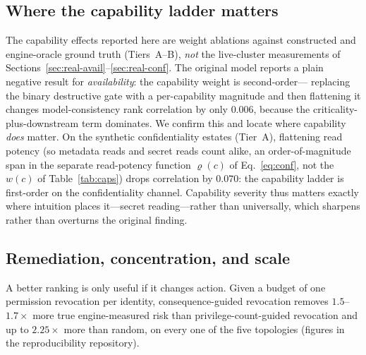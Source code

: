 \documentclass[conference]{IEEEtran}
\begin{document}
\subsection{Where the capability ladder matters}
The capability effects reported here are weight ablations against constructed and
engine-oracle ground truth (Tiers~A--B), \emph{not} the live-cluster measurements of
Sections~\ref{sec:real-avail}--\ref{sec:real-conf}. The original model reports a plain
negative result for \emph{availability}: the capability weight is second-order---
replacing the binary destructive gate with a per-capability magnitude and then
flattening it changes model-consistency rank correlation by only $0.006$, because the
criticality-plus-downstream term dominates. We confirm this and locate where capability
\emph{does} matter. On the synthetic confidentiality estates (Tier~A), flattening read
potency (so metadata reads and secret reads count alike, an order-of-magnitude span in
the separate read-potency function $\varrho(c)$ of Eq.~\eqref{eq:conf}, not the $w(c)$ of
Table~\ref{tab:caps}) drops correlation by $0.070$: the capability ladder is first-order
on the confidentiality channel. Capability severity thus matters exactly where intuition
places it---secret reading---rather than universally, which sharpens rather than
overturns the original finding.

\subsection{Remediation, concentration, and scale}
\label{sec:scale}
A better ranking is only useful if it changes action. Given a budget of one
permission revocation per identity, consequence-guided revocation removes
$1.5$--$1.7\times$ more true engine-measured risk than privilege-count-guided
revocation and up to $2.25\times$ more than random, on every one of the five
topologies (figures in the reproducibility repository).
\end{document}

